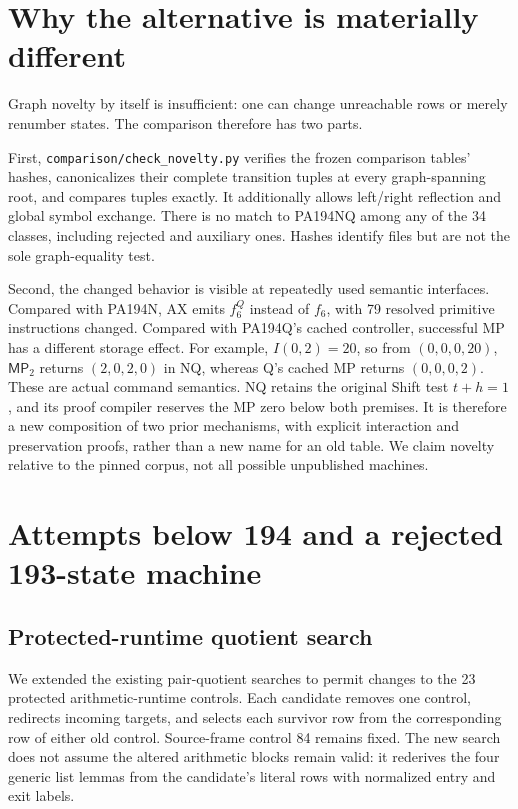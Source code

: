 \documentclass[10pt,letterpaper]{article}
\newcommand{\MP}{\mathsf{MP}}
\newcommand{\file}[1]{\nolinkurl{#1}}
\begin{document}
\section{Why the alternative is materially different}\label{sec:novelty}

Graph novelty by itself is insufficient: one can change unreachable rows
or merely renumber states. The comparison therefore has two parts.

First, \file{comparison/check_novelty.py} verifies the frozen comparison
tables' hashes, canonicalizes their complete transition tuples at every
graph-spanning root, and compares tuples exactly. It additionally allows
left/right reflection and global symbol exchange. There is no match to
PA194NQ among any of the 34 classes, including rejected and auxiliary
ones. Hashes identify files but are not the sole graph-equality test.

Second, the changed behavior is visible at repeatedly used semantic
interfaces. Compared with PA194N, AX emits \(f_6^Q\) instead of \(f_6\),
with 79 resolved primitive instructions changed. Compared with PA194Q's
cached controller, successful MP has a different storage effect. For
example, \(I(0,2)=20\), so from \((0,0,0,20)\), \(\MP_2\) returns
\((2,0,2,0)\) in NQ, whereas Q's cached MP returns \((0,0,0,2)\).
These are actual command semantics. NQ retains the original Shift test
\(t+h=1\), and its proof compiler reserves the MP zero below both premises.
It is therefore a new composition of two prior mechanisms, with explicit
interaction and preservation proofs, rather than a new name for an old
table. We claim novelty relative to the pinned corpus, not all possible
unpublished machines.

\section{Attempts below 194 and a rejected 193-state machine}

\subsection{Protected-runtime quotient search}

We extended the existing pair-quotient searches to permit changes to the
23 protected arithmetic-runtime controls. Each candidate removes one
control, redirects incoming targets, and selects each survivor row from
the corresponding row of either old control. Source-frame control 84
remains fixed. The new search does not assume the altered arithmetic
blocks remain valid: it rederives the four generic list lemmas from the
candidate's literal rows with normalized entry and exit labels.
\end{document}
